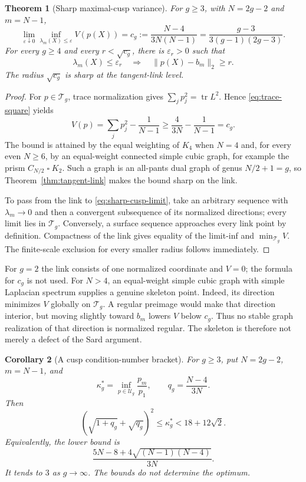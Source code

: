 \documentclass[11pt,reqno]{amsart}
\newtheorem{theorem}{Theorem}[section]
\newtheorem{corollary}[theorem]{Corollary}
\theoremstyle{definition}
\theoremstyle{remark}
\newcommand{\tr}{\operatorname{tr}}
\begin{document}
\begin{theorem}[Sharp maximal-cusp variance]\label{thm:sharp-cusp}
For $g\ge3$, with $N=2g-2$ and $m=N-1$,
\begin{equation}\label{eq:sharp-cusp-limit}
 \boxed{
 \lim_{\varepsilon\downarrow0}
 \inf_{\lambda_m(X)\le\varepsilon}V(p(X))
 =c_g:=\frac{N-4}{3N(N-1)}
 =\frac{g-3}{3(g-1)(2g-3)}.}
\end{equation}
For every $g\ge4$ and every $r<\sqrt{c_g}$, there is $\varepsilon_r>0$
such that
\[
 \lambda_m(X)\le\varepsilon_r
 \quad\Longrightarrow\quad
 \|p(X)-b_m\|_2\ge r.
\]
The radius $\sqrt{c_g}$ is sharp at the tangent-link level.
\end{theorem}

\begin{proof}
For $p\in\mathcal T_g$, trace normalization gives
$\sum_jp_j^2=\tr L^2$.  Hence \eqref{eq:trace-square} yields
\[
 V(p)=\sum_jp_j^2-\frac1{N-1}
 \ge\frac4{3N}-\frac1{N-1}=c_g.
\]
The bound is attained by the equal weighting of $K_4$ when $N=4$ and, for
every even $N\ge6$, by an equal-weight connected simple cubic graph, for
example the prism $C_{N/2}\mathbin\square K_2$.  Such a graph is an all-pants
dual graph of genus $N/2+1=g$, so Theorem~\ref{thm:tangent-link} makes the
bound sharp on the link.

To pass from the link to \eqref{eq:sharp-cusp-limit}, take an arbitrary
sequence with $\lambda_m\to0$ and then a convergent subsequence of its
normalized directions; every limit lies in $\mathcal T_g$.  Conversely, a
surface sequence approaches every link point by definition.  Compactness of
the link gives equality of the limit-inf and $\min_{\mathcal T_g}V$.  The
finite-scale exclusion for every smaller radius follows immediately.
\end{proof}

For $g=2$ the link consists of one normalized coordinate and $V=0$; the
formula for $c_g$ is not used.  For $N>4$, an equal-weight simple cubic graph
with simple Laplacian spectrum supplies a genuine skeleton point.  Indeed,
its direction minimizes $V$ globally on $\mathcal T_g$.  A regular preimage
would make that direction interior, but moving slightly toward $b_m$ lowers
$V$ below $c_g$.  Thus no stable graph realization of that direction is
normalized regular.  The skeleton is therefore not merely a defect of the
Sard argument.

\begin{corollary}[A cusp condition-number bracket]
\label{cor:cusp-condition-bracket}
For $g\ge3$, put $N=2g-2$, $m=N-1$, and
\[
 \kappa_g^*=\inf_{p\in\mathcal U_g}\frac{p_m}{p_1},
 \qquad
 q_g=\frac{N-4}{3N}.
\]
Then
\begin{equation}\label{eq:cusp-condition-bracket}
 \left(\sqrt{1+q_g}+\sqrt{q_g}\right)^2
 \le\kappa_g^*<18+12\sqrt2.
\end{equation}
Equivalently, the lower bound is
\[
 \frac{5N-8+4\sqrt{(N-1)(N-4)}}{3N}.
\]
It tends to $3$ as $g\to\infty$.  The bounds do not determine the optimum.
\end{corollary}
\end{document}

